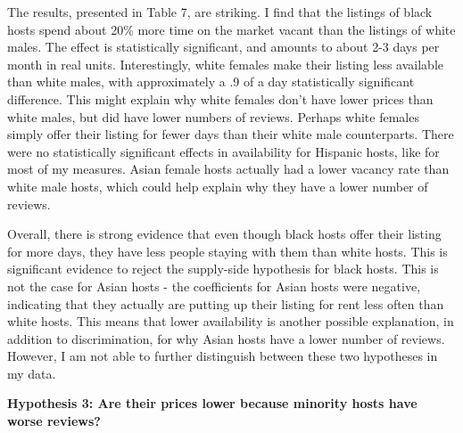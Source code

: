 \documentclass[11pt, oneside]{article}
\begin{document}
The results, presented in Table 7, are striking. I find that the listings of black hosts spend about 20\% more time on the market vacant than the listings of white males. The effect is statistically significant, and amounts to about 2-3 days per month in real units. Interestingly, white females make their listing less available than white males, with approximately a .9 of a day statistically significant difference. This might explain why white females don't have lower prices than white males, but did have lower numbers of reviews. Perhaps white females simply offer their listing for fewer days than their white male counterparts. There were no statistically significant effects in availability for Hispanic hosts, like for most of my measures. Asian female hosts actually had a lower vacancy rate than white male hosts, which could help explain why they have a lower number of reviews. 

Overall, there is strong evidence that even though black hosts offer their listing for more days, they have less people staying with them than white hosts. This is significant evidence to reject the supply-side hypothesis for black hosts. This is not the case for Asian hosts - the coefficients for Asian hosts were negative, indicating that they actually are putting up their listing for rent less often than white hosts. This means that lower availability is another possible explanation, in addition to discrimination, for why Asian hosts have a lower number of reviews. However, I am not able to further distinguish between these two hypotheses in my data.  

\textbf{Hypothesis 3: Are their prices lower because minority hosts have worse reviews?} 
\end{document}
